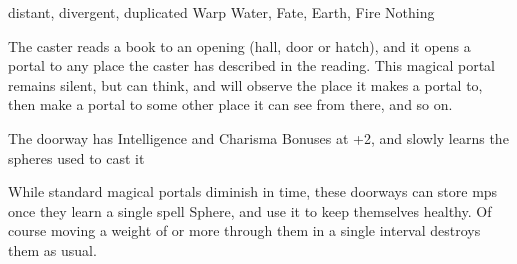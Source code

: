   {distant, divergent, duplicated}%
  {Warp}%
  {Water, Fate, Earth, Fire}%
  {Nothing}%
  {The caster reads a book to an opening (hall, door or hatch), and it opens a portal to any place the caster has described in the reading.
  This magical portal remains silent, but can think, and will observe the place it makes a portal to, then make a portal to some other place it can see from there, and so on.

  The doorway has Intelligence and Charisma Bonuses at +2, and slowly learns the spheres used to cast it}%
  {
  While standard magical portals diminish in time, these doorways can store \glspl{mp} once they learn a single spell Sphere, and use it to keep themselves healthy.
  Of course moving a \gls{weight} of  or more through them in a single \gls{interval} destroys them as usual.}

